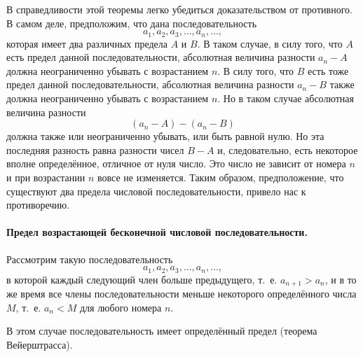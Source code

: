\documentclass[oneside]{book}
\begin{document}
В справедливости этой теоремы легко убедиться доказательством от противного.
В самом деле, предположим, что дана последовательность
\[a_1,a_2,a_3,\dots,a_n,\dots,\]
которая имеет два различных предела $A$ и $B$.
В таком случае, в силу того, что $A$ есть предел данной последовательности, абсолютная величина разности $a_n-A$ должна неограниченно убывать с возрастанием $n$.
В силу того, что $B$ есть тоже предел данной последовательности, абсолютная величина разности $a_n-B$ также должна неограниченно убывать с возрастанием $n$.
Но в таком случае абсолютная величина разности
\[(a_n-A)-(a_n-B)\]
должна также или неограниченно убывать, или быть равной нулю.
Но эта последняя разность равна разности чисел $B-A$ и, следовательно, есть некоторое вполне определённое, отличное от нуля число.
Это число не зависит от номера $n$ и при возрастании $n$ вовсе не изменяется.
Таким образом, предположение, что существуют два предела числовой последовательности, привело нас к противоречию.

\paragraph{Предел возрастающей бесконечной числовой последовательности.}\label{1938/229}
Рассмотрим такую последовательность 
\[a_1, a_2, a_3,\dots,a_n,\dots,\]
в которой каждый следующий член больше предыдущего, т.~е. $a_{n+1} > a_n$, и в то же время все члены последовательности меньше некоторого определённого числа $M$, т.~е. $a_n < M$ для любого номера $n$.

В этом случае последовательность имеет определённый предел (теорема Вейерштрасса).
\end{document}
